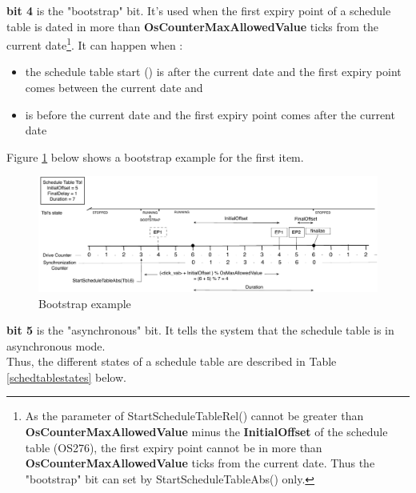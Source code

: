 \textbf{bit 4} is the "bootstrap" bit. It's used when the first expiry point of a schedule table is dated in more than \textbf{OsCounterMaxAllowedValue} ticks from the current date\footnote{As the  parameter of StartScheduleTableRel() cannot be greater than \textbf{OsCounterMaxAllowedValue} minus the \textbf{InitialOffset} of the schedule table (OS276), the first expiry point cannot be in more than \textbf{OsCounterMaxAllowedValue} ticks from the current date. Thus the "bootstrap" bit can set by StartScheduleTableAbs() only.}. It can happen when :
	\begin{itemize}
	\item the schedule table start () is after the current date and the first expiry point comes between the current date and 
	\item {} is before the current date and the first expiry point comes after the current date
	\end{itemize}

Figure \ref{fig:bootstrapexample} below shows a bootstrap example for the first item.

\begin{figure}[H] %
   \centering
   \includegraphics[scale=0.6]{pictures/BootstrapExample.pdf}  
   \caption{Bootstrap example}
   \label{fig:bootstrapexample}
\end{figure} 

\textbf{bit 5} is the "asynchronous" bit. It tells the system that the schedule table is in asynchronous mode.\\
Thus, the different states of a schedule table are described in Table \ref{schedtablestates} below.


